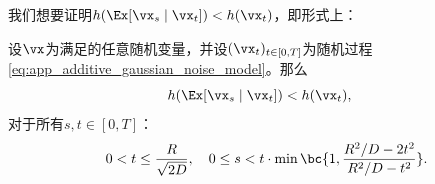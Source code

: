 \documentclass[../../book-main_zh.tex]{subfiles}
\begin{document}
我们想要证明\(h(\Ex[\vx_{s} \mid \vx_{t}]) < h(\vx_{t})\)，即形式上：
\begin{theorem}\label{thm:conditioning_reduces_entropy}
    设\(\vx\)为满足的任意随机变量，并设\((\vx_{t})_{t \in [0, T]}\)为随机过程\eqref{eq:app_additive_gaussian_noise_model}。那么
    \begin{equation}
        h(\Ex[\vx_{s} \mid \vx_{t}]) < h(\vx_{t}),
    \end{equation}
 对于所有$s,  t \in [0, T]$：
\begin{equation}
 \quad 0 < t \leq \frac{R}{\sqrt{2D}},
        \quad 0 \leq s  < t\cdot\min\bc{1, \frac{R^{2}/D -
        2t^{2}}{R^{2}/D - t^{2}}}.
    \end{equation}
\end{theorem}
\end{document}
